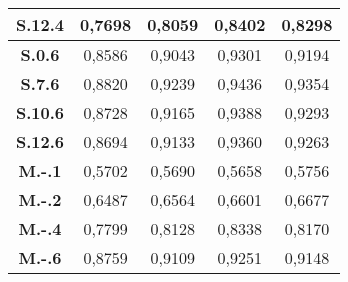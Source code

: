 \begin{apendicesenv}
\begin{table}[!h]
\begin{tabular}{|c|c|c|c|c|}
\textbf{S.12.4} & 0,7698      & 0,8059      & 0,8402      & 0,8298      \\ \hline
\textbf{S.0.6}  & 0,8586      & 0,9043      & 0,9301      & 0,9194      \\ \hline
\textbf{S.7.6}  & 0,8820      & 0,9239      & 0,9436      & 0,9354      \\ \hline
\textbf{S.10.6} & 0,8728      & 0,9165      & 0,9388      & 0,9293      \\ \hline
\textbf{S.12.6} & 0,8694      & 0,9133      & 0,9360      & 0,9263      \\ \hline
\textbf{M.-.1}  & 0,5702      & 0,5690      & 0,5658      & 0,5756      \\ \hline
\textbf{M.-.2}  & 0,6487      & 0,6564      & 0,6601      & 0,6677      \\ \hline
\textbf{M.-.4}  & 0,7799      & 0,8128      & 0,8338      & 0,8170      \\ \hline
\textbf{M.-.6}  & 0,8759      & 0,9109      & 0,9251      & 0,9148      \\ \hline
\end{tabular}
\end{table}



\end{apendicesenv}
